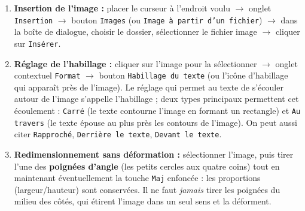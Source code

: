 \documentclass[11pt]{article}
\newcommand{\cle}[1]{{\popxbold\color{popdark}#1}}
\begin{document}
\begin{corrige}
\begin{enumerate}
\item \textbf{Insertion de l'image :} placer le curseur à l'endroit voulu $\to$ onglet \texttt{Insertion} $\to$ bouton \texttt{Images} (ou \texttt{Image à partir d'un fichier}) $\to$ dans la boîte de dialogue, choisir le dossier, sélectionner le fichier image $\to$ cliquer sur \texttt{Insérer}.
\item \textbf{Réglage de l'habillage :} cliquer sur l'image pour la sélectionner $\to$ onglet contextuel \texttt{Format} $\to$ bouton \texttt{Habillage du texte} (ou l'icône d'habillage qui apparaît près de l'image). Le réglage qui permet au texte de s'écouler autour de l'image s'appelle l'\cle{habillage} ; deux types principaux permettent cet écoulement : \texttt{Carré} (le texte contourne l'image en formant un rectangle) et \texttt{Au travers} (le texte épouse au plus près les contours de l'image). On peut aussi citer \texttt{Rapproché}, \texttt{Derrière le texte}, \texttt{Devant le texte}.
\item \textbf{Redimensionnement sans déformation :} sélectionner l'image, puis tirer l'une des \textbf{poignées d'angle} (les petits cercles aux quatre coins) tout en maintenant éventuellement la touche \texttt{Maj} enfoncée : les proportions (largeur/hauteur) sont conservées. Il ne faut \emph{jamais} tirer les poignées du milieu des côtés, qui étirent l'image dans un seul sens et la déforment.
\end{enumerate}
\end{corrige}
\end{document}
